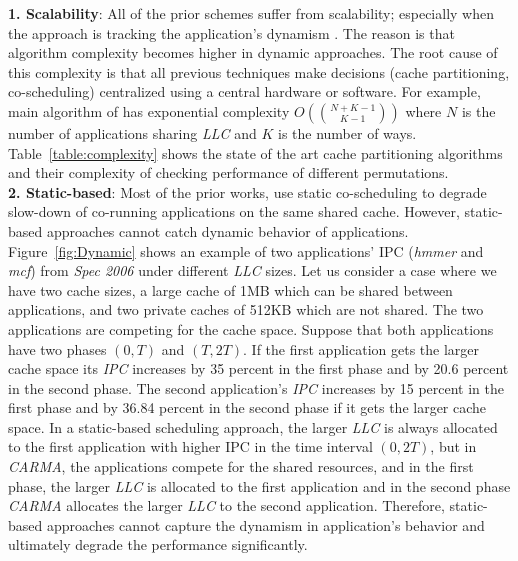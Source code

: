 \indent \textbf{1. Scalability}: All of the prior schemes suffer from scalability; especially when the approach is tracking the application's dynamism \cite{qureshi2006utility, zhuravlev2010addressing, jiang2008analysis}. The reason is that algorithm complexity becomes higher in dynamic approaches. The root cause of this complexity is that all previous techniques make decisions (cache partitioning, co-scheduling) centralized using a central hardware or software. For example, main algorithm of \cite{qureshi2006utility} has exponential complexity $O( \binom{N+K-1}{K-1} )$ where $N$ is the number of applications sharing \textit{LLC} and $K$ is the number of ways. Table~\ref{table:complexity} shows the state of the art cache partitioning algorithms and their complexity of checking performance of different permutations.\\
\indent \textbf{2. Static-based}: Most of the prior works, use static co-scheduling to degrade slow-down of co-running applications on the same shared cache. However, static-based approaches cannot catch dynamic behavior of applications. Figure~\ref{fig:Dynamic} shows an example of two applications' IPC (\textit{hmmer} and \textit{mcf}) from \textit{Spec 2006} under different \textit{LLC} sizes. Let us consider a case where we have two cache sizes, a large cache of 1MB which can be shared between applications, and two private caches of 512KB which are not shared. The two applications are competing for the cache space. Suppose that both applications have two phases $(0,T)$ and $(T,2T)$. If the first application gets the larger cache space its \textit{IPC} increases by 35 percent in the first phase and by 20.6 percent in the second phase. The second application's \textit{IPC} increases by 15 percent in the first phase and by 36.84 percent in the second phase if it gets the larger cache space. In a static-based scheduling approach, the larger \textit{LLC} is always allocated to the first application with higher IPC in the time interval $(0, 2T)$, but in \textit{CARMA}, the applications compete for the shared resources, and in the first phase, the larger \textit{LLC} is allocated to the first application and in the second phase \textit{CARMA} allocates the larger \textit{LLC} to the second application. Therefore, static-based approaches cannot capture the dynamism in application's behavior and ultimately degrade the performance significantly. \\
